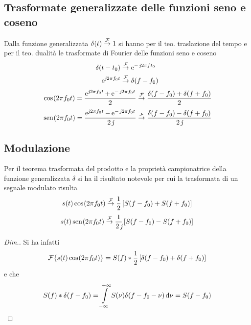 \subsection{Trasformate generalizzate delle funzioni seno e coseno}
Dalla funzione generalizzata $\delta(t)\overset{\operatorname{\mathcal{F}}}{\rightarrow}1$ si hanno per il teo. traslazione del tempo e per il teo. dualità le trasformate di Fourier delle funzioni seno e coseno
\begin{align*}
\delta(t-t_0)&\overset{\operatorname{\mathcal{F}}}{\to}\operatorname{e}^{-\operatorname{\mathit{j}\!} 2\pi f t_0}\\
\operatorname{e}^{\operatorname{\mathit{j}\!} 2\pi f_0 t}&\overset{\operatorname{\mathcal{F}}}{\to}\delta(f-f_0)
\end{align*}
\begin{equation}
\,{\operatorname{cos}}^{}\!\left({2\pi f_0 t}\right)=\frac{\operatorname{e}^{\operatorname{\mathit{j}\!} 2\pi f_0 t}+\operatorname{e}^{-\operatorname{\mathit{j}\!} 2\pi f_0 t}}{2}\overset{\operatorname{\mathcal{F}}}{\to}\frac{\delta(f-f_0)+\delta(f+f_0)}{2}\end{equation}
\begin{equation}\,{\operatorname{sen}}^{}\!\left({2\pi f_0 t}\right)=\frac{\operatorname{e}^{\operatorname{\mathit{j}\!} 2\pi f_0 t}-\operatorname{e}^{-\operatorname{\mathit{j}\!} 2\pi f_0 t}}{2\operatorname{\mathit{j}\!}}\overset{\operatorname{\mathcal{F}}}{\to}\frac{\delta(f-f_0)-\delta(f+f_0)}{2\operatorname{\mathit{j}\!}}\end{equation}

\subsection{Modulazione}
Per il teorema trasformata del prodotto e la proprietà campionatrice della funzione generalizzata $\delta$ si ha il risultato notevole per cui la trasformata di un segnale modulato risulta
\begin{equation}\label{eq:fourier_modulazione_coseno}
s(t) \,{\operatorname{cos}}^{}\!\left({2\pi f_0 t}\right)\overset{\operatorname{\mathcal{F}}}{\to}\frac{1}{2}\left[S(f-f_0)+S(f+f_0)\right]
\end{equation}
\begin{equation}
s(t) \,{\operatorname{sen}}^{}\!\left({2\pi f_0 t}\right)\overset{\operatorname{\mathcal{F}}}{\to}\frac{1}{2\operatorname{\mathit{j}\!}}\left[S(f-f_0)-S(f+f_0)\right]
\end{equation}

\begin{proof}[Dim.]
Si ha infatti \[\operatorname{\mathcal{F}}\!\left\lbrace{s(t)\,{\operatorname{cos}}^{}\!\left({2\pi f_0 t}\right)}\right\rbrace=S(f)\ast\frac{1}{2}\left[\delta(f-f_0)+\delta(f+f_0)\right]\] e che \[S(f)\ast\delta(f-f_0)=\int\limits_{-\infty}^{+\infty}{S(\nu)\delta(f-f_0-\nu)}{\,\mathop{}\!\mathrm{d}{\nu}}=S(f-f_0)\qedhere\]
\end{proof}

